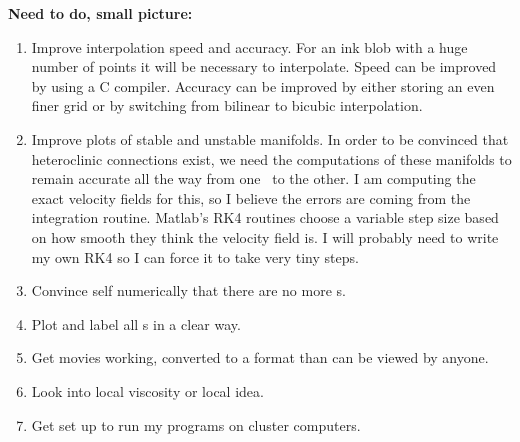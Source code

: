 \textbf{Need to do, small picture:}
\begin{enumerate}
\item Improve interpolation speed and accuracy. For an ink blob with
a huge number of points it will be necessary to interpolate. Speed
can be improved by using a C compiler. Accuracy can be improved by
either storing an even finer grid or by switching from bilinear to
bicubic interpolation.
\item Improve plots of stable and unstable manifolds. In order to be
convinced that heteroclinic connections exist, we need the
computations of these manifolds to remain accurate all the way from
one \stagp\ to the other. I am computing the exact velocity fields
for this, so I
believe the errors are coming from the integration routine. Matlab's
RK4 routines choose a variable step size based on how smooth they
think the velocity field is. I will probably need to write my own
RK4 so I can force it to take very tiny steps.
\item Convince self numerically that there are no more \stagp s.
\item Plot and label all \stagp s in a clear way.
\item Get movies working, converted to a format than can be viewed
by anyone.
\item Look into local viscosity or local \Reynolds idea.
\item Get set up to run my programs on cluster computers.
\end{enumerate}

